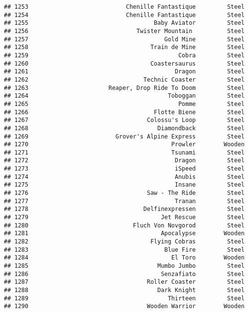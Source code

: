 \documentclass[
]{article}
\begin{document}
\begin{verbatim}
## 1253                            Chenille Fantastique         Steel
## 1254                            Chenille Fantastique         Steel
## 1255                                    Baby Aviator         Steel
## 1256                               Twister Mountain          Steel
## 1257                                       Gold Mine         Steel
## 1258                                   Train de Mine         Steel
## 1259                                           Cobra         Steel
## 1260                                   Coastersaurus         Steel
## 1261                                          Dragon         Steel
## 1262                                 Technic Coaster         Steel
## 1263                       Reaper, Drop Ride To Doom         Steel
## 1264                                        Toboggan         Steel
## 1265                                           Pomme         Steel
## 1266                                    Flotte Biene         Steel
## 1267                                  Colossu's Loop         Steel
## 1268                                     Diamondback         Steel
## 1269                         Grover's Alpine Express         Steel
## 1270                                         Prowler        Wooden
## 1271                                         Tsunami         Steel
## 1272                                          Dragon         Steel
## 1273                                          iSpeed         Steel
## 1274                                          Anubis         Steel
## 1275                                          Insane         Steel
## 1276                                  Saw - The Ride         Steel
## 1277                                          Tranan         Steel
## 1278                                 Delfinexpressen         Steel
## 1279                                      Jet Rescue         Steel
## 1280                              Fluch Von Novgorod         Steel
## 1281                                      Apocalypse        Wooden
## 1282                                   Flying Cobras         Steel
## 1283                                       Blue Fire         Steel
## 1284                                         El Toro        Wooden
## 1285                                     Mumbo Jumbo         Steel
## 1286                                      Senzafiato         Steel
## 1287                                  Roller Coaster         Steel
## 1288                                     Dark Knight         Steel
## 1289                                        Thirteen         Steel
## 1290                                  Wooden Warrior        Wooden

\end{verbatim}
\end{document}
